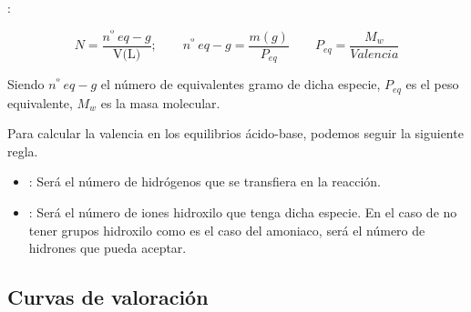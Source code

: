     :

    \begin{equation*}
        N = \dfrac{n^\text{º}\ eq-g}{\text{V(L)}}; \qquad n^\text{º}\ eq-g = \dfrac{m(g)}{P_{eq}} \qquad P_{eq} = \dfrac{M_w}{Valencia}
    \end{equation*}

    Siendo \(n^\text{º}\ eq-g\) el número de equivalentes gramo de dicha especie, \(P_{eq}\) es el peso equivalente, \(M_w\) es la masa molecular.

    Para calcular la valencia en los equilibrios ácido-base, podemos seguir la siguiente regla.

    \begin{itemize}
        \item {}: Será el número de hidrógenos que se transfiera en la reacción.
        \item {}: Será el número de iones hidroxilo que tenga dicha especie.
        En el caso de no tener grupos hidroxilo como es el caso del amoniaco, será el número de hidrones que pueda aceptar.
    \end{itemize}

    \subsection{Curvas de valoración}\label{subsec:curvas-de-valoracion}

